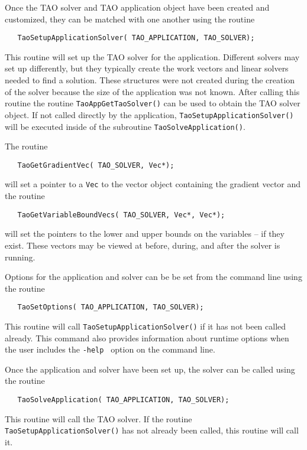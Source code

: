 Once the TAO solver and TAO application object have been created and customized, 
they can be matched with one another
using the routine 
\begin{verbatim} 
   TaoSetupApplicationSolver( TAO_APPLICATION, TAO_SOLVER);
\end{verbatim}
\noindent
This routine will set up the TAO solver for the application.  
Different solvers may set up differently, but they typically
create the work vectors and linear solvers needed to find a solution.  
These structures were not created
during the creation of the solver because the size of the application
was not known.
After calling this routine
the routine {\tt  TaoAppGetTaoSolver()} can be used to obtain
the TAO solver object.  If not called directly by the application, 
\texttt{TaoSetupApplicationSolver()} will be executed inside of the
subroutine \texttt{TaoSolveApplication()}.

The routine 
\begin{verbatim}
   TaoGetGradientVec( TAO_SOLVER, Vec*);
\end{verbatim}
\noindent
will set a pointer to a {\tt Vec} to the vector object containing
the gradient vector and the  routine
\begin{verbatim}
   TaoGetVariableBoundVecs( TAO_SOLVER, Vec*, Vec*);
\end{verbatim}
\noindent
will set the pointers to the lower and upper bounds on the variables  -- if 
they exist.  These vectors may be viewed at before, during, and after
the solver is running.

Options for the application and solver 
can be be set from the command line using the routine  
\begin{verbatim}
   TaoSetOptions( TAO_APPLICATION, TAO_SOLVER);
\end{verbatim}
This routine will call  {\tt TaoSetupApplicationSolver()} if it has not been
called already.
This command also provides information about runtime options when the
user includes the {\tt -help } option on the
command line.


Once the application and solver have been set up, the solver can be called using the routine
\begin{verbatim}
   TaoSolveApplication( TAO_APPLICATION, TAO_SOLVER);
\end{verbatim}
\noindent
This  routine will call the TAO solver.  If the routine  {\tt TaoSetupApplicationSolver()}
has not already been called, this routine will call it.

